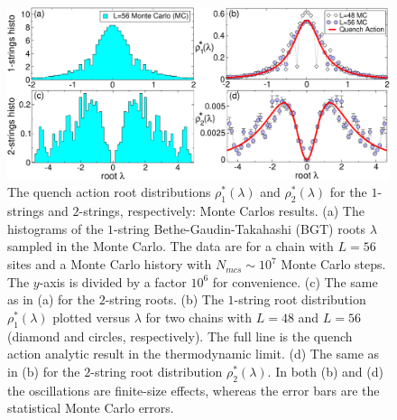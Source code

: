 \documentclass[11pt]{iopart}
\begin{document}
\begin{figure}[t]
\begin{center}
\includegraphics[width=.95\textwidth]{./draft_figs/Neel_rho}
\end{center}
\caption{ The quench action root distributions $\rho^*_1(\lambda)$ and 
 $\rho^*_2(\lambda)$ for the $1$-strings and $2$-strings, respectively: Monte 
 Carlos results. (a) The histograms of the $1$-string Bethe-Gaudin-Takahashi 
 (BGT) roots $\lambda$ sampled in the Monte Carlo. The data are for a chain 
 with $L=56$ sites and a Monte Carlo history with $N_{mcs}\sim 10^7$ Monte 
 Carlo steps. The $y$-axis is divided by a factor $10^6$ for convenience. 
 (c) The same as in (a) for the $2$-string roots. (b) The $1$-string root distribution 
 $\rho^*_1(\lambda)$ plotted versus $\lambda$ for two chains with $L=48$ 
 and $L=56$ (diamond and circles, respectively). The full line 
 is the quench action analytic result in the thermodynamic limit. (d) 
 The same as in (b) for the $2$-string root distribution $\rho^*_2(\lambda)$. 
 In both (b) and (d) the oscillations are finite-size effects, whereas 
 the error bars are the statistical Monte Carlo errors. 
}
\label{fig4:Neel-rho}
\end{figure}
\end{document}

